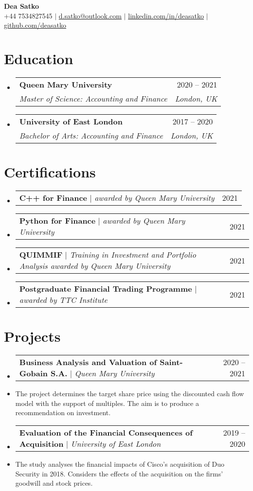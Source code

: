 \documentclass[letterpaper,11pt]{article}
\makeatletter
\newcommand{\resumeText}[1]{
  \item\small{
    {#1 \vspace{-2pt}}
  }
}
\newcommand{\resumeSubheading}[4]{
  \vspace{-2pt}\item
    \begin{tabular*}{0.97\textwidth}[t]{l@{\extracolsep{\fill}}r}
      \textbf{#1} & #2 \\
      \textit{\small#3} & \textit{\small #4} \\
    \end{tabular*}\vspace{-7pt}
}
\newcommand{\resumeProjectHeading}[2]{
    \item
    \begin{tabular*}{0.97\textwidth}{l@{\extracolsep{\fill}}r}
      \small#1 & #2 \\
    \end{tabular*}\vspace{-7pt}
}
\newcommand{\resumeSubHeadingListStart}{\begin{itemize}[leftmargin=0.15in, label={}]}
\newcommand{\resumeSubHeadingListEnd}{\end{itemize}}
\makeatother
\begin{document}
\begin{center}
    \textbf{\Huge Dea Satko} \\ \vspace{1pt}
    \small +44 7534827545 $|$ \href{mailto:d.satko@outlook.com}{{d.satko@outlook.com}} $|$ 
    \href{https://www.linkedin.com/in/deasatko/}{{linkedin.com/in/deasatko}} $|$
    \href{https://github.com/deasatko/}{{github.com/deasatko}}
\end{center}


\section{Education}
  \resumeSubHeadingListStart
    \resumeSubheading
      {Queen Mary University}{2020 -- 2021}
      {Master of Science: Accounting and Finance}{London, UK}
    \resumeSubheading
      {University of East London}{2017 -- 2020}
      {Bachelor of Arts: Accounting and Finance}{London, UK}
  \resumeSubHeadingListEnd

\section{Certifications}
  \resumeSubHeadingListStart
    \resumeProjectHeading
      {\textbf{C++ for Finance} $|$ \emph{awarded by Queen Mary University}}{2021}
    \resumeProjectHeading
      {\textbf{Python for Finance} $|$ \emph{awarded by Queen Mary University}}{2021}
    \resumeProjectHeading
      {\textbf{QUIMMIF} $|$ \emph{Training in Investment and Portfolio Analysis awarded by Queen Mary University}}{2021}
    \resumeProjectHeading
      {\textbf{Postgraduate Financial Trading Programme} $|$ \emph{awarded by TTC Institute}}{2021}
\resumeSubHeadingListEnd

\section{Projects}
    \resumeSubHeadingListStart
      \resumeProjectHeading
        {\textbf{\href{https://github.com/deasatko/University/tree/main/Masters/Dissertation}{\faGithub} Business Analysis and Valuation of Saint-Gobain S.A.} $|$ \emph{Queen Mary University}}{2020 -- 2021}
        \resumeText{The project determines the target share price using the discounted cash flow model with the support of multiples. The aim is to produce a recommendation on investment.} 
      \resumeProjectHeading
      {\textbf{\href{https://github.com/deasatko/University/tree/main/Bachelors/Dissertation}{\faGithub} Evaluation of the Financial Consequences of Acquisition} $|$ \emph{University of East London}}{2019 -- 2020}
      \resumeText{The study analyses the financial impacts of Cisco’s acquisition of Duo Security in 2018. Considers the effects of the acquisition on the firms’ goodwill and stock prices.} 
    \resumeSubHeadingListEnd
\end{document}
